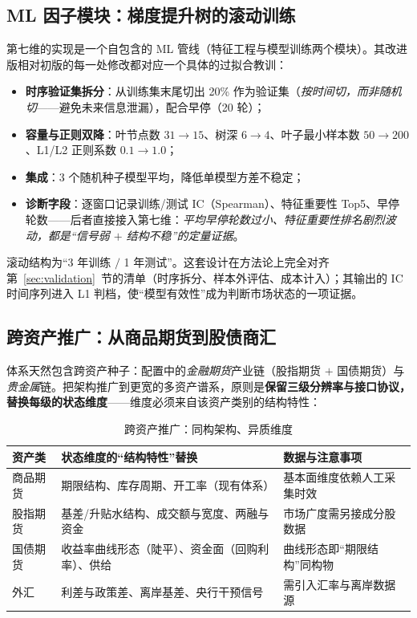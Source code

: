 \subsection{ML 因子模块：梯度提升树的滚动训练}

第七维的实现是一个自包含的 ML 管线（特征工程与模型训练两个模块）。其改进版相对初版的每一处修改都对应一个具体的过拟合教训：

\begin{itemize}[itemsep=2pt]
\item \textbf{时序验证集拆分}：从训练集末尾切出 20\% 作为验证集（\emph{按时间切，而非随机切}——避免未来信息泄漏），配合早停（20 轮）；
\item \textbf{容量与正则双降}：叶节点数 $31\to15$、树深 $6\to4$、叶子最小样本数 $50\to200$、L1/L2 正则系数 $0.1\to1.0$；
\item \textbf{集成}：3 个随机种子模型平均，降低单模型方差不稳定；
\item \textbf{诊断字段}：逐窗口记录训练/测试 IC（Spearman）、特征重要性 Top5、早停轮数——后者直接接入第七维：\emph{平均早停轮数过小、特征重要性排名剧烈波动，都是“信号弱 $+$ 结构不稳”的定量证据}。
\end{itemize}

滚动结构为“3 年训练 $/$ 1 年测试”。这套设计在方法论上完全对齐第~\ref{sec:validation}~节的清单（时序拆分、样本外评估、成本计入）；其输出的 IC 时间序列进入 L1 判档，使“模型有效性”成为判断市场状态的一项证据。

\subsection{跨资产推广：从商品期货到股债商汇}

体系天然包含跨资产种子：配置中的\emph{金融期货}产业链（股指期货 $+$ 国债期货）与\emph{贵金属}链。把架构推广到更宽的多资产谱系，原则是\textbf{保留三级分辨率与接口协议，替换每级的状态维度}——维度必须来自该资产类别的结构特性：

\begin{table}[htbp]
\centering
\footnotesize
\begin{tabular}{p{2.1cm}p{5.2cm}p{4.2cm}}
\toprule
\textbf{资产类} & \textbf{状态维度的“结构特性”替换} & \textbf{数据与注意事项} \\
\midrule
商品期货 & 期限结构、库存周期、开工率（现有体系） & 基本面维度依赖人工采集时效 \\
股指期货 & 基差/升贴水结构、成交额与宽度、两融与资金 & 市场广度需另接成分股数据 \\
国债期货 & 收益率曲线形态（陡平）、资金面（回购利率）、供给 & 曲线形态即“期限结构”同构物 \\
外汇 & 利差与政策差、离岸基差、央行干预信号 & 需引入汇率与离岸数据源 \\
\bottomrule
\end{tabular}
\caption{跨资产推广：同构架构、异质维度}
\label{tab:cross-asset}
\end{table}

